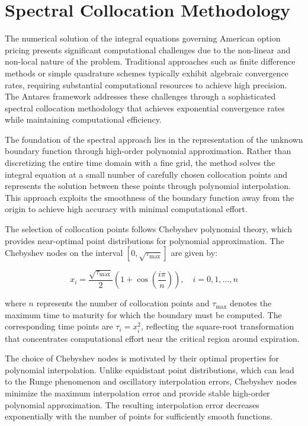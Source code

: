 \documentclass[
  american,
  11pt,
  11pt,
  letterpaper,
  onecolumn]{article}
\begin{document}
\section{Spectral Collocation
Methodology}\label{spectral-collocation-methodology}

The numerical solution of the integral equations governing American
option pricing presents significant computational challenges due to the
non-linear and non-local nature of the problem. Traditional approaches
such as finite difference methods or simple quadrature schemes typically
exhibit algebraic convergence rates, requiring substantial computational
resources to achieve high precision. The Antares framework addresses
these challenges through a sophisticated spectral collocation
methodology that achieves exponential convergence rates while
maintaining computational efficiency.

The foundation of the spectral approach lies in the representation of
the unknown boundary function through high-order polynomial
approximation. Rather than discretizing the entire time domain with a
fine grid, the method solves the integral equation at a small number of
carefully chosen collocation points and represents the solution between
these points through polynomial interpolation. This approach exploits
the smoothness of the boundary function away from the origin to achieve
high accuracy with minimal computational effort.

The selection of collocation points follows Chebyshev polynomial theory,
which provides near-optimal point distributions for polynomial
approximation. The Chebyshev nodes on the interval
\([0, \sqrt{\tau_{\max}}]\) are given by:

\[x_i = \frac{\sqrt{\tau_{\max}}}{2}\left(1 + \cos\left(\frac{i\pi}{n}\right)\right), \quad i = 0, 1, \ldots, n\]

where \(n\) represents the number of collocation points and
\(\tau_{\max}\) denotes the maximum time to maturity for which the
boundary must be computed. The corresponding time points are
\(\tau_i = x_i^2\), reflecting the square-root transformation that
concentrates computational effort near the critical region around
expiration.

The choice of Chebyshev nodes is motivated by their optimal properties
for polynomial interpolation. Unlike equidistant point distributions,
which can lead to the Runge phenomenon and oscillatory interpolation
errors, Chebyshev nodes minimize the maximum interpolation error and
provide stable high-order polynomial approximation. The resulting
interpolation error decreases exponentially with the number of points
for sufficiently smooth functions.
\end{document}

